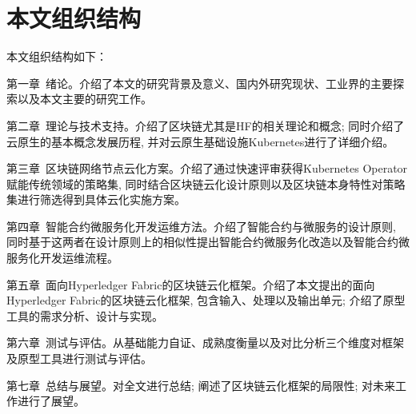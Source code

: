 \section{本文组织结构}

本文组织结构如下：

第一章~绪论。介绍了本文的研究背景及意义、国内外研究现状、工业界的主要探索以及本文主要的研究工作。

第二章~理论与技术支持。介绍了区块链尤其是HF的相关理论和概念; 同时介绍了云原生的基本概念发展历程, 并对云原生基础设施Kubernetes进行了详细介绍。

第三章~区块链网络节点云化方案。介绍了通过快速评审获得Kubernetes Operator赋能传统领域的策略集, 同时结合区块链云化设计原则以及区块链本身特性对策略集进行筛选得到具体云化实施方案。

第四章~智能合约微服务化开发运维方法。介绍了智能合约与微服务的设计原则, 同时基于这两者在设计原则上的相似性提出智能合约微服务化改造以及智能合约微服务化开发运维流程。

第五章~面向Hyperledger Fabric的区块链云化框架。介绍了本文提出的面向Hyperledger Fabric的区块链云化框架, 包含输入、处理以及输出单元; 介绍了原型工具的需求分析、设计与实现。

第六章~测试与评估。从基础能力自证、成熟度衡量以及对比分析三个维度对框架及原型工具进行测试与评估。

第七章~总结与展望。对全文进行总结; 阐述了区块链云化框架的局限性; 对未来工作进行了展望。


